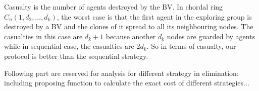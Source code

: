 Casualty is the number of agents destroyed by the BV. In chordal ring $C_n(1, d_2,\dots, d_k)$, the worst case is that the first agent in the exploring group is destroyed by a BV and the clones of it spread to all its neighbouring nodes. The casualties in this case are $d_k+1$ because another $d_k$ nodes are guarded by agents while in sequential case, the casualties are $2d_k$. So in terms of casualty, our protocol is better than the sequential strategy.

Following part are reserved for analysis for different strategy in elimination: including proposing function to calculate the exact cost of different strategies...





